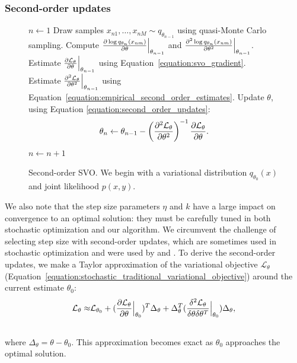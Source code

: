  \subsubsection{Second-order updates}
 \label{section:second_order_updates}
\begin{figure}
     \begin{algorithmic}[1]
    \setlength{\topsep}{1pt}
    \setlength{\itemsep}{2pt}
    \setlength{\parskip}{1pt}
    \setlength{\parsep}{1pt}

     \STATE $n \gets 1$
    \STATE Draw samples $x_{n1}, \ldots, x_{nM} \sim q_{\theta_{n - 1}}$ using quasi-Monte Carlo sampling.
    \STATE Compute $\frac{\partial \log q_{\theta_n}(x_{nm})}{\partial \theta} \Bigr|_{\theta_{n-1}}$ and
    $\frac{\partial^2 \log q_{\theta_n}(x_{nm})}{\partial {\theta}^2} \Bigr|_{\theta_{n-1}}$. %
    \STATE Estimate $\frac{\partial \mathcal{L}_\theta }{\partial \theta} \Bigr|_{\theta_{n-1}}$ using Equation~\ref{equation:svo_gradient}.
    \STATE Estimate $\frac{\partial^2 \mathcal{L}_\theta }{\partial {\theta}^2} \Bigr|_{\theta_{n-1}}$ using Equation~\ref{equation:empirical_second_order_estimates}.
    \STATE Update $\theta$, using Equation \ref{equation:second_order_updates}:
        \vspace{-10pt}
	\begin{align*}
     	   \displaystyle \theta_n \gets \theta_{n-1} - \left( 
     	\frac{\partial^2 \mathcal{L}_\theta }{\partial {\theta}^2}
     	\right)^{-1}
     	\frac{\partial \mathcal{L}_\theta }{\partial \theta}.  \end{align*}
    \vspace{-15pt}
    \STATE $n \gets n + 1$ %
    \ENDWHILE
   \end{algorithmic}
     \caption{Second-order SVO. We begin with a variational distribution
       $q_{\theta_0}(x)$ and joint likelihood $p(x, y)$.  }
     \label{figure:second_order_algorithm}
\end{figure}

We also note that the step size parameters $\eta$ and $k$ have a large
impact on convergence to an optimal solution: they must be carefully
tuned in both stochastic optimization and our algorithm. We circumvent
the challenge of selecting step size with second-order updates, which
are sometimes used in stochastic optimization
\cite{robbins:1951,bottou:2004} and were used by
\citet{carbonetto:2009} and \citet{wei:1990}.  To derive the
second-order updates, we make a Taylor approximation of the
variational objective $\mathcal{L}_\theta$
(Equation~\ref{equation:stochastic_traditional_variational_objective}) around the
current estimate $\theta_0$:
\begin{align}
  \mathcal{L}_\theta \approx & \mathcal{L}_{\theta_0} + ( \frac{\partial \mathcal{L}_\theta }{\partial \theta} \Bigr|_{\theta_0} )^T \Delta_\theta
 + \Delta_\theta^T ( \frac{\delta^2 \mathcal{L}_\theta }{\delta \theta \delta \theta^T} \Bigr|_{\theta_0} ) \Delta_\theta, \\ \nonumber
\end{align}
where $\Delta_\theta = \theta - \theta_0$.  This approximation becomes
exact as $\theta_0$ approaches the optimal solution.

